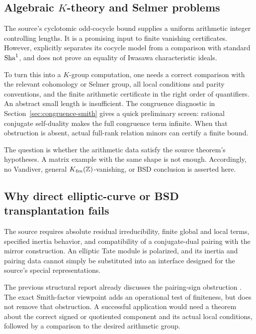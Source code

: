 \subsection{Algebraic \texorpdfstring{\(K\)}{K}-theory and Selmer problems}

The source's cyclotomic odd-cocycle bound supplies a uniform arithmetic
integer controlling lengths. It is a promising input to finite
vanishing certificates. However,
 explicitly separates
its cocycle model from a comparison with standard \(\mathrm{Sha}^1\), and does
not prove an equality of Iwasawa characteristic ideals.

To turn this into a \(K\)-group computation, one needs a correct
comparison with the relevant cohomology or Selmer group, all local
conditions and parity conventions, and the finite arithmetic certificate
in the right order of quantifiers. An abstract small length is insufficient.
The congruence diagnostic in Section~\ref{sec:congruence-smith} gives a
quick preliminary screen: rational conjugate self-duality makes the
full congruence term infinite. When that obstruction is absent,
actual full-rank relation minors can certify a finite bound.

The question is whether the arithmetic data satisfy the source theorem's
hypotheses. A matrix example with the same shape is not enough.
Accordingly, no Vandiver, general \(K_{4m}(\mathbb Z)\)-vanishing, or BSD
conclusion is asserted here.

\subsection{Why direct elliptic-curve or BSD transplantation fails}

The source  requires absolute residual irreducibility,
finite global and local terms, specified inertia behavior, and compatibility
of a conjugate-dual pairing with the mirror construction.
An elliptic Tate module is polarized, and its inertia and pairing data
cannot simply be substituted into an interface designed for the source's
special representations.

The previous structural report already discusses the pairing-sign
obstruction \cite{IncomingStructural}. The exact Smith-factor viewpoint
adds an operational test of finiteness, but does not remove that
obstruction. A successful application would need a theorem about
the correct signed or quotiented component and its actual local
conditions, followed by a comparison to the desired arithmetic group.

